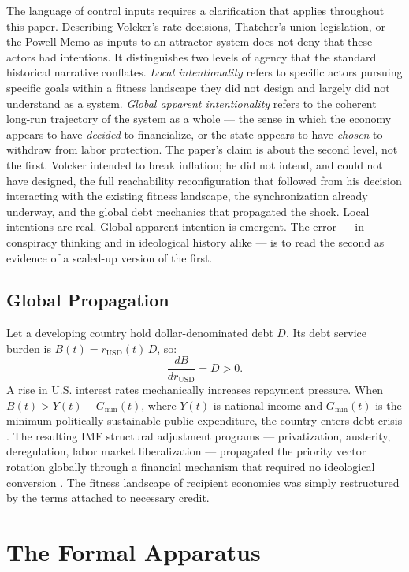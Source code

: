 \documentclass[12pt, a4paper]{article}
\theoremstyle{named}
\begin{document}
The language of control inputs requires a clarification that applies
throughout this paper. Describing Volcker's rate decisions, Thatcher's
union legislation, or the Powell Memo as inputs to an attractor system
does not deny that these actors had intentions. It distinguishes two
levels of agency that the standard historical narrative conflates.
\emph{Local intentionality} refers to specific actors pursuing specific
goals within a fitness landscape they did not design and largely did not
understand as a system. \emph{Global apparent intentionality} refers to
the coherent long-run trajectory of the system as a whole — the sense
in which the economy appears to have \emph{decided} to financialize, or
the state appears to have \emph{chosen} to withdraw from labor
protection. The paper's claim is about the second level, not the first.
Volcker intended to break inflation; he did not intend, and could not
have designed, the full reachability reconfiguration that followed from
his decision interacting with the existing fitness landscape, the
synchronization already underway, and the global debt mechanics that
propagated the shock. Local intentions are real. Global apparent
intention is emergent. The error — in conspiracy thinking and in
ideological history alike — is to read the second as evidence of a
scaled-up version of the first.

\subsection{Global Propagation}

Let a developing country hold dollar-denominated debt $D$. Its debt
service burden is $B(t) = r_{\mathrm{USD}}(t)\,D$, so:
\[
  \frac{dB}{dr_{\mathrm{USD}}} = D > 0.
\]
A rise in U.S. interest rates mechanically increases repayment pressure.
When $B(t) > Y(t) - G_{\min}(t)$, where $Y(t)$ is national income and
$G_{\min}(t)$ is the minimum politically sustainable public expenditure,
the country enters debt crisis \cite{stiglitz2002,rodrik2011}. The
resulting IMF structural adjustment programs — privatization, austerity,
deregulation, labor market liberalization — propagated the priority
vector rotation globally through a financial mechanism that required no
ideological conversion \cite{harvey2005,dumenil2004}. The fitness
landscape of recipient economies was simply restructured by the terms
attached to necessary credit.

\section{The Formal Apparatus}
\end{document}
